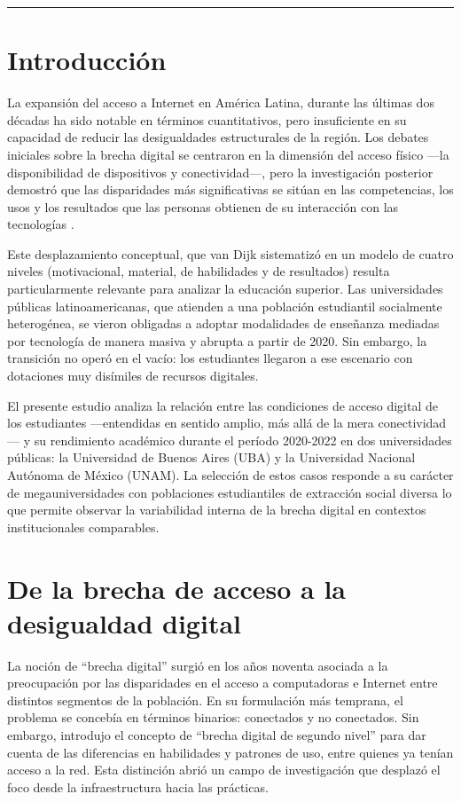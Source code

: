 \documentclass{article}
\begin{document}
\bigskip
\noindent\rule{\linewidth}{0.4pt}
\bigskip

\section{Introducción}
La expansión del acceso a Internet en América Latina, durante las últimas dos décadas ha sido notable en términos cuantitativos, pero insuficiente en su capacidad de reducir las desigualdades estructurales de la región. Los debates iniciales sobre la brecha digital se centraron en la dimensión del acceso físico —la disponibilidad de dispositivos y conectividad—, pero la investigación posterior demostró que las disparidades más significativas se sitúan en las competencias, los usos y los resultados que las personas obtienen de su interacción con las tecnologías \autocite{2565-HARGITTAI2002,2562-WARSCHAUER2004}.

Este desplazamiento conceptual, que van Dijk \autocite{2563-VANDIJK2020} sistematizó en un modelo de cuatro niveles (motivacional, material, de habilidades y de resultados) resulta particularmente relevante para analizar la educación superior. Las universidades públicas latinoamericanas, que atienden a una población estudiantil socialmente heterogénea, se vieron obligadas a adoptar modalidades de enseñanza mediadas por tecnología de manera masiva y abrupta a partir de 2020. Sin embargo, la transición no operó en el vacío: los estudiantes llegaron a ese escenario con dotaciones muy disímiles de recursos digitales.

El presente estudio analiza la relación entre las condiciones de acceso digital de los estudiantes —entendidas en sentido amplio, más allá de la mera conectividad— y su rendimiento académico durante el período 2020-2022 en dos universidades públicas: la Universidad de Buenos Aires (UBA) y la Universidad Nacional Autónoma de México (UNAM). La selección de estos casos responde a su carácter de megauniversidades con poblaciones estudiantiles de extracción social diversa lo que permite observar la variabilidad interna de la brecha digital en contextos institucionales comparables.


\section{De la brecha de acceso a la desigualdad digital}
La noción de “brecha digital” surgió en los años noventa asociada a la preocupación por las disparidades en el acceso a computadoras e Internet entre distintos segmentos de la población. En su formulación más temprana, el problema se concebía en términos binarios: conectados y no conectados. Sin embargo, \textcite{2565-HARGITTAI2002} introdujo el concepto de “brecha digital de segundo nivel” para dar cuenta de las diferencias en habilidades y patrones de uso, entre quienes ya tenían acceso a la red. Esta distinción abrió un campo de investigación que desplazó el foco desde la infraestructura hacia las prácticas.
\end{document}
